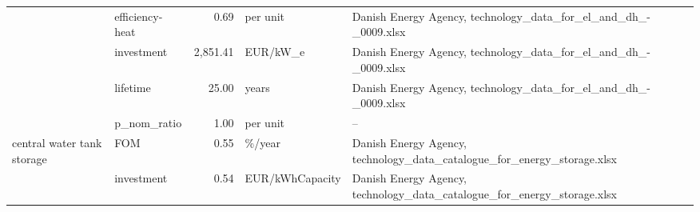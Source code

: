 \begin{longtable}{p{5cm}p{3cm}rp{3cm}p{11cm}}
                      & efficiency-heat &           0.69 &                          per unit &                                                                                                                                                                                                                                                                      Danish Energy Agency, technology\_data\_for\_el\_and\_dh\_-\_0009.xlsx \\
                      & investment &       2,851.41 &                          EUR/kW\_e &                                                                                                                                                                                                                                                                      Danish Energy Agency, technology\_data\_for\_el\_and\_dh\_-\_0009.xlsx \\
                      & lifetime &          25.00 &                             years &                                                                                                                                                                                                                                                                      Danish Energy Agency, technology\_data\_for\_el\_and\_dh\_-\_0009.xlsx \\
                      & p\_nom\_ratio &           1.00 &                          per unit &                                                                                                                                                                                                                                                                                                                                   -- \\
central water tank storage & FOM &           0.55 &                            \%/year &                                                                                                                                                                                                                                                              Danish Energy Agency, technology\_data\_catalogue\_for\_energy\_storage.xlsx \\
                      & investment &           0.54 &                   EUR/kWhCapacity &                                                                                                                                                                                                                                                              Danish Energy Agency, technology\_data\_catalogue\_for\_energy\_storage.xlsx \\

\end{longtable}
